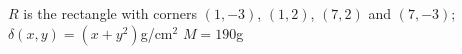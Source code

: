 {$R$ is the rectangle with corners $(1,-3)$, $(1,2)$, $(7,2)$ and $(7,-3)$; $\delta(x,y) = (x+y^2)$g/cm$^2$
}
{$M = 190$g%
}